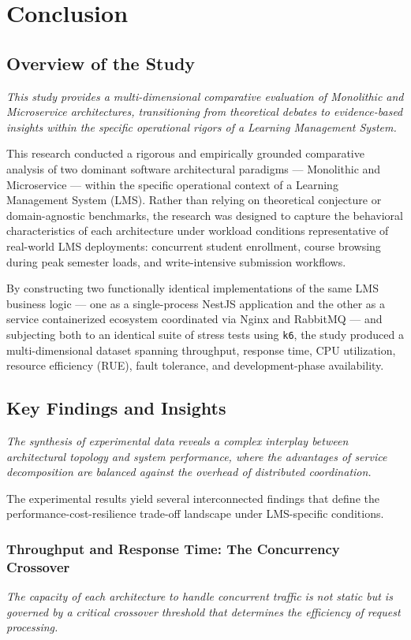 \chapter{Conclusion}

\section{Overview of the Study}
\textit{This study provides a multi-dimensional comparative evaluation of Monolithic and Microservice architectures, 
transitioning from theoretical debates to evidence-based insights within the specific operational rigors of a Learning Management System.} 

This research conducted a rigorous and empirically grounded comparative analysis of two dominant 
software architectural paradigms — Monolithic and Microservice — within the specific operational 
context of a Learning Management System (LMS). Rather than relying on theoretical conjecture or 
domain-agnostic benchmarks, the research was designed to capture the behavioral characteristics 
of each architecture under workload conditions representative of real-world LMS deployments: concurrent 
student enrollment, course browsing during peak semester loads, and write-intensive submission workflows. 

By constructing two functionally identical implementations of the same LMS business logic — one as a 
single-process NestJS application and the other as a service containerized ecosystem coordinated via 
Nginx and RabbitMQ — and subjecting both to an identical suite of stress tests using \texttt{k6}, the 
study produced a multi-dimensional dataset spanning throughput, response time, CPU utilization, 
resource efficiency (RUE), fault tolerance, and development-phase availability.


\section{Key Findings and Insights}
\textit{The synthesis of experimental data reveals a complex interplay between architectural topology and system performance, where the advantages of service decomposition are balanced against the overhead of distributed coordination.}

The experimental results yield several interconnected findings that define the performance-cost-resilience trade-off landscape under LMS-specific conditions.

\subsection{Throughput and Response Time: The Concurrency Crossover}
\textit{The capacity of each architecture to handle concurrent traffic is not static but is governed by a critical crossover threshold that determines the efficiency of request processing.}



